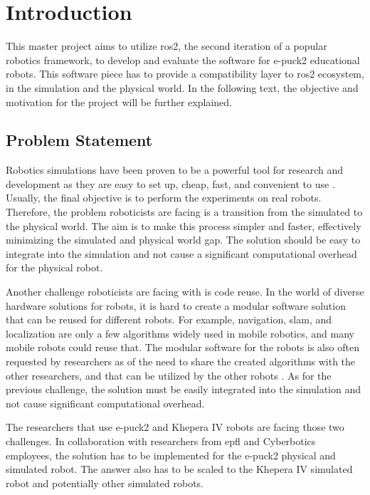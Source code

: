 \chapter{Introduction}
\label{chap:introduction}

This master project aims to utilize \ac{ros2}, the second iteration of a popular robotics framework, to develop and evaluate the software for e-puck2 educational robots. This software piece has to provide a compatibility layer to \ac{ros2} ecosystem, in the simulation and the physical world. In the following text, the objective and motivation for the project will be further explained.

\section{Problem Statement}
Robotics simulations have been proven to be a powerful tool for research and development as they are easy to set up, cheap, fast, and convenient to use \cite{michel_cyberbotics_2004}. Usually, the final objective is to perform the experiments on real robots. Therefore, the problem roboticists are facing is a transition from the simulated to the physical world. The aim is to make this process simpler and faster, effectively minimizing the simulated and physical world gap. The solution should be easy to integrate into the simulation and not cause a significant computational overhead for the physical robot.

Another challenge roboticists are facing with is code reuse. In the world of diverse hardware solutions for robots, it is hard to create a modular software solution that can be reused for different robots. For example, navigation, \ac{slam}, and localization are only a few algorithms widely used in mobile robotics, and many mobile robots could reuse that. The modular software for the robots is also often requested by researchers as of the need to share the created algorithms with the other researchers, and that can be utilized by the other robots \cite{vaughan_really_2007}. As for the previous challenge, the solution must be easily integrated into the simulation and not cause significant computational overhead.

The researchers that use e-puck2 and Khepera IV robots are facing those two challenges. In collaboration with researchers from \ac{epfl} and Cyberbotics employees, the solution has to be implemented for the e-puck2 physical and simulated robot. The answer also has to be scaled to the Khepera IV simulated robot and potentially other simulated robots.

